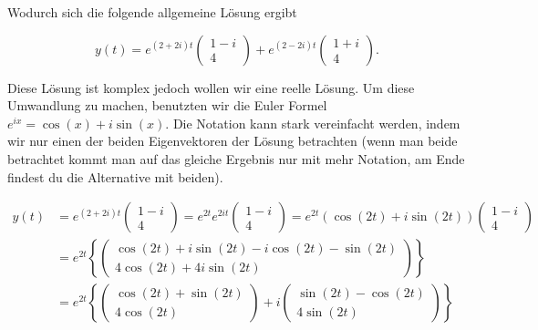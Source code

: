 Wodurch sich die folgende allgemeine Lösung ergibt

\begin{equation*}
    y(t) = e^{(2+2i)t} \begin{pmatrix}
        1-i \\ 4
    \end{pmatrix} + e^{(2-2i)t} \begin{pmatrix}
        1+i \\ 4
    \end{pmatrix}.
\end{equation*}

Diese Lösung ist komplex jedoch wollen wir eine reelle Lösung. Um diese Umwandlung zu machen, benutzten wir die Euler Formel \( e^{ix} = \cos(x) + i \sin(x) \). Die Notation kann stark vereinfacht werden, indem wir nur einen der beiden Eigenvektoren der Lösung betrachten (wenn man beide betrachtet kommt man auf das gleiche Ergebnis nur mit mehr Notation, am Ende findest du die Alternative mit beiden). 

\begin{equation*}
    \begin{aligned}
        y(t) &= e^{(2+2i)t} \begin{pmatrix}
            1-i \\ 4
        \end{pmatrix} = e^{2t} e^{2it} \begin{pmatrix}
            1-i \\ 4
        \end{pmatrix} = e^{2t} \left( \cos(2t) + i \sin(2t) \right) \begin{pmatrix}
            1-i \\ 4
        \end{pmatrix} \\[0.5em]
        &= e^{2t} \left\{ \begin{pmatrix}
            \cos(2t) + i \sin(2t) - i \cos(2t) - \sin(2t) \\
            4 \cos(2t) + 4i \sin(2t)
        \end{pmatrix} \right\} \\[0.5em]
        &= e^{2t} \left\{ \begin{pmatrix}
            \cos(2t) + \sin(2t) \\
            4 \cos(2t)
        \end{pmatrix} + i \begin{pmatrix}
            \sin(2t) - \cos(2t) \\
            4 \sin(2t)
        \end{pmatrix} \right\} 
    \end{aligned}
\end{equation*}

